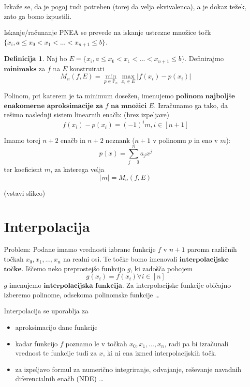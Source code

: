 \documentclass[a4paper,12pt]{article}
\theoremstyle{definition}
\newtheorem{defn}[counter]{Definicija}
\theoremstyle{remark}
\newcommand{\Pp}{\mathbb{P}}
\begin{document}
Izkaže se, da je pogoj tudi potreben (torej da velja ekvivalenca), a je dokaz težek, zato ga bomo izpustili.

Iskanje/računanje PNEA se prevede na iskanje ustrezne množice točk $\{x_i, a \leq x_0 < x_1 < \dots < x_{n+1} \leq b\}$.

\begin{defn}
    Naj bo $E = \{x_i, a \leq x_0 < x_1 < \dots < x_{n+1} \leq b\}$. Definirajmo $\textbf{minimaks}$ za $f$ na $E$ konstruirati
    \begin{equation*}
        M_n (f, E) = \min_{p \in \Pp_n} \max_{x_i \in E} \left| f(x_i) - p(x_i) \right|
    \end{equation*}
\end{defn}

Polinom, pri katerem je ta minimum dosežen, imenujemo $\textbf{polinom}$ $\textbf{najboljše}$ $\textbf{enakomerne}$ $\textbf{aproksimacije}$ $\textbf{za}$ $f$
$\textbf{na}$ $\textbf{množici}$ $E$. Izračunamo ga tako,
da rešimo naslednji sistem linearnih enačb: (brez izpeljave)
\begin{equation*}
    f(x_i) - p(x_i) = (-1)^i m, i \in [n+1] 
\end{equation*}

Imamo torej $n+2$ enačb in $n+2$ neznank ($n + 1$ v polinomu $p$ in eno v $m$):
\begin{equation*}
    p(x) = \sum_{j = 0}^{n} a_j x^j
\end{equation*}
ter koeficient $m$, za katerega velja
\begin{equation*}
    \left| m \right| = M_n (f, E)
\end{equation*}

(vstavi slikco)

\section{Interpolacija}
Problem: Podane imamo vrednosti izbrane funkcije $f$ v $n+1$ paroma različnih točkah $x_0, x_1, \dots, x_n$ na realni osi. Te točke bomo imenovali
$\textbf{interpolacijske}$ $\textbf{točke}$. Iščemo neko preprostejšo funkcijo $g$, ki zadošča pohojem
\begin{equation*}
    g(x_i) = f(x_i) \forall i \in [n]
\end{equation*}
$g$ imenujemo $\textbf{interpolacijska}$ $\textbf{funkcija}$. Za interpolacijske funkcije običajno izberemo polinome, odsekoma polinomske funkcije \dots


Interpolacija se uporablja za
\begin{itemize}
    \item aproksimacijo dane funkcije
    \item kadar funkcijo $f$ poznamo le v točkah $x_0, x_1, \dots, x_n$, radi pa bi izračunali vrednost te funkcije tudi za $x$, ki ni ena izmed interpolacijskih točk.
    \item za izpeljavo formul za numerično integriranje, odvajanje, reševanje navadnih diferencialnih enačb (NDE) \dots
\end{itemize}
\end{document}

